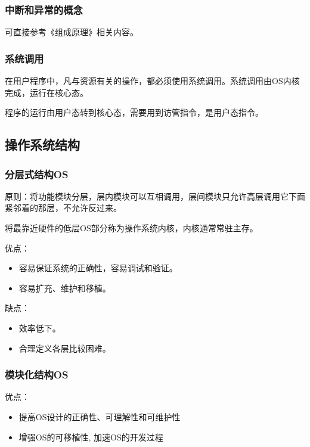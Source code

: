 \documentclass[12pt, a4paper, oneside]{ctexart}
\begin{document}
\subsubsection{中断和异常的概念}

可直接参考《组成原理》相关内容。

\subsubsection{系统调用}

在用户程序中，凡与资源有关的操作，都必须使用系统调用。系统调用由OS内核完成，运行在核心态。

程序的运行由用户态转到核心态，需要用到访管指令，是用户态指令。

\subsection{操作系统结构}

\subsubsection{分层式结构OS}

原则：将功能模块分层，层内模块可以互相调用，层间模块只允许高层调用它下面紧邻着的那层，不允许反过来。

将最靠近硬件的低层OS部分称为操作系统内核，内核通常常驻主存。

优点：
\begin{itemize}
    \item 容易保证系统的正确性，容易调试和验证。
    \item 容易扩充、维护和移植。
\end{itemize}

缺点：
\begin{itemize}
  \item 效率低下。
  \item 合理定义各层比较困难。
\end{itemize}

\subsubsection{模块化结构OS}

优点：
\begin{itemize}
    \item 提高OS设计的正确性、可理解性和可维护性
    \item 增强OS的可移植性, 加速OS的开发过程
\end{itemize}
\end{document}
